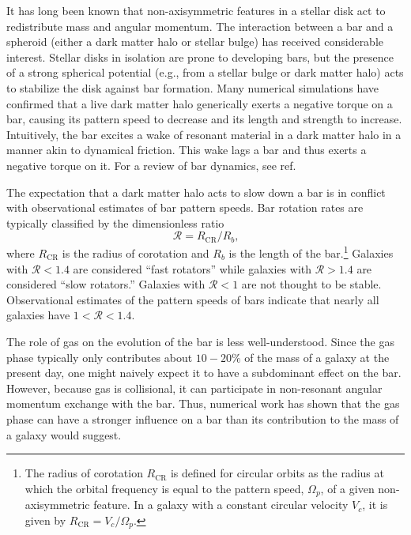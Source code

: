 \documentclass[twoside]{natureprintstyle}
\newcommand{\RCR}{\ensuremath{R_{\textrm{CR}}}}
\newcommand{\Rot}{\ensuremath{\mathcal{R}}}
\begin{document}
It has long been known that non-axisymmetric features in a stellar disk act to
redistribute mass and angular momentum.\cite{1972MNRAS.157....1L} The
interaction between a bar and a spheroid (either a dark matter halo or stellar
bulge) has received considerable interest.\cite{1984MNRAS.209..729T,
1985MNRAS.213..451W} Stellar disks in isolation are prone to developing bars,
\cite{1971ApJ...168..343H} but the presence of a strong spherical potential
(e.g., from a stellar bulge or dark matter halo) acts to stabilize the disk
against bar formation.\cite{1973ApJ...186..467O, 1976AJ.....81...30H} Many
numerical simulations have confirmed that a live dark matter halo generically
exerts a negative torque on a bar, causing its pattern speed to decrease and
its length and strength to increase\cite{1992ApJ...400...80H,
2000ApJ...543..704D, 2002MNRAS.330...35A, 2002ApJ...569L..83A,
2003MNRAS.341.1179A, 2003MNRAS.346..251O, 2005MNRAS.363..991H,
2006ApJ...637..214M, 2007MNRAS.375..460W, 2009ApJ...697..293D}. Intuitively,
the bar excites a wake of resonant material in a dark matter halo in a manner
akin to dynamical friction. This wake lags a bar and thus exerts a negative
torque on it. For a review of bar dynamics, see ref.\cite{1993RPPh...56..173S}

The expectation that a dark matter halo acts to slow down a bar is in
conflict with observational estimates of bar pattern speeds. Bar rotation
rates are typically classified by the dimensionless ratio
\begin{equation}
\Rot = \RCR/R_b\textrm{,}
\end{equation}
where \RCR{} is the radius of corotation and $R_b$ is the length of the
bar.\footnote{The radius of corotation \RCR{} is defined for circular orbits
as the radius at which the orbital frequency is equal to the pattern speed,
$\Omega_p$, of a given non-axisymmetric feature. In a galaxy with a constant
circular velocity $V_c$, it is given by $\RCR = V_c / \Omega_p$.} Galaxies
with $\Rot < 1.4$ are considered ``fast rotators'' while galaxies with $\Rot >
1.4$ are considered ``slow rotators.''\cite{2000ApJ...543..704D} Galaxies with
$\Rot < 1$ are not thought to be stable.\cite{1980AA....81..198C}
Observational estimates of the pattern speeds of bars indicate that nearly all
galaxies have $1 < \Rot < 1.4$.\cite{2011MSAIS..18...23C, 2015AA...576A.102A,
2019MNRAS.482.1733G, 2020MNRAS.491.3655G}

The role of gas on the evolution of the bar is less well-understood. Since the
gas phase typically only contributes about $10-20\%$ of the mass of a galaxy
at the present day, one might naively expect it to have a subdominant effect
on the bar. However, because gas is collisional, it can participate in
non-resonant angular momentum exchange with the bar.\cite{2011MNRAS.415.1027H}
Thus, numerical work has shown that the gas phase can have a stronger
influence on a bar than its contribution to the mass of a galaxy would
suggest.\cite{2010ApJ...719.1470V, 2013MNRAS.429.1949A}
\end{document}
